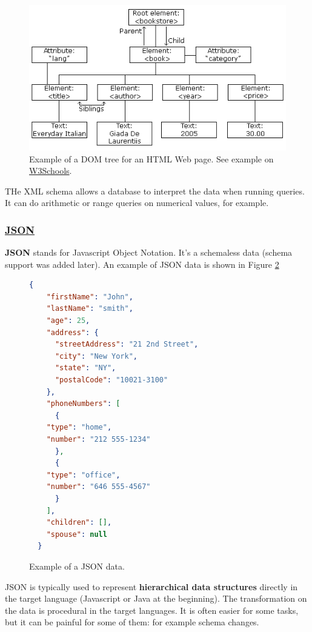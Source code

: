 \begin{figure}[H]%
 \centering
 \includegraphics[width=15cm]{./img/04/dom}
 \caption{\label{pic:dom} Example of a DOM tree for an HTML Web page. See example on \href{http://www.w3schools.com/xml/dom_intro.asp}{W3Schools}.}
\end{figure}

THe XML schema allows a database to interpret the data when running queries. It can do arithmetic or range queries on numerical values, for example.

\subsubsection{\href{https://en.wikipedia.org/wiki/JSON}{JSON}}

{\bf JSON} stands for Javascript Object Notation. It's a schemaless data (schema support was added later). An example of JSON data is shown in Figure \ref{pic:json}

\begin{figure}[t]%
  \begin{lstlisting}[language=json]
  {
    "firstName": "John",
    "lastName": "smith",
    "age": 25,
    "address": {
      "streetAddress": "21 2nd Street",
      "city": "New York",
      "state": "NY",
      "postalCode": "10021-3100"
    },
    "phoneNumbers": [
      {
	"type": "home",
	"number": "212 555-1234"
      },
      {
	"type": "office",
	"number": "646 555-4567"
      }
    ],
    "children": [],
    "spouse": null
  }
  \end{lstlisting}
 \caption{\label{pic:json} Example of a JSON data.}
\end{figure}



JSON is typically used to represent {\bf hierarchical data structures} directly in the target language (Javascript or Java at the beginning). The transformation on the data is procedural in the target languages. It is often easier for some tasks, but it can be painful for some of them: for example schema changes.

